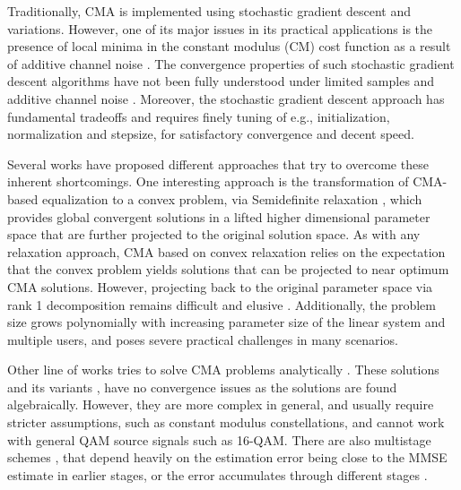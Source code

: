 Traditionally, CMA is implemented using stochastic gradient descent and variations. 
However, one of its major issues in its practical applications is the presence of local minima in the constant modulus (CM) cost function as a result of additive channel noise \cite{Fijalkow1998,Chung1998}. 
The convergence properties of such stochastic gradient descent algorithms have not been fully understood under limited samples and additive channel noise \cite{Ding2000,Zeng1999analysiscma,Dabeer2003convergencecma}.  
Moreover, the stochastic gradient descent approach has fundamental tradeoffs and requires finely tuning of e.g., initialization, normalization and stepsize, for satisfactory convergence and decent speed. 

%
Several works have proposed different approaches that try to overcome these inherent shortcomings.
%
One interesting approach is the transformation of CMA-based equalization to a convex problem, via Semidefinite relaxation \cite{Mariere2003BlindCM,Luo2004sdrquadratic,Wang2018sdrbe}, which provides  global convergent solutions in a lifted higher dimensional parameter space that are further projected to the original solution space. 
As with any relaxation approach, CMA based on convex relaxation relies on the expectation that the convex problem yields solutions that can be projected to near optimum CMA solutions. However, projecting back to the original parameter space via rank 1 decomposition remains difficult and elusive \cite{Adler2019nuclearnorm}.
Additionally, the problem size grows polynomially with increasing parameter size of the linear system and multiple users, and poses severe practical challenges in many scenarios. 
%

Other line of works tries to solve CMA problems analytically \cite{Hassibi1994closedformcma,vanderVeen1996acma}. These solutions and its variants \cite{vanderVeen2005adaptiveacma,Zarzoso2008optimalstepsizecma}, have no convergence issues as the solutions are found algebraically.
However, they are more complex in general, and usually require stricter assumptions, such as constant modulus constellations, and cannot work with general QAM source signals such as 16-QAM. 
There are also multistage schemes \cite{Shynk1994performancemultistagecma}, that depend heavily on the estimation error being close to the MMSE estimate in earlier stages, or the error accumulates through different stages \cite{Liu1999cmaarray}. 
%

